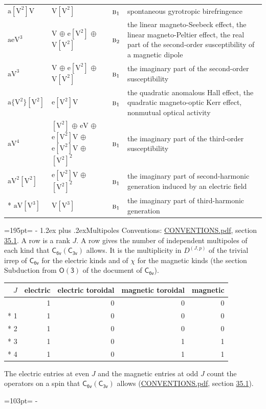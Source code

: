 \documentclass[10pt,a4paper]{article}
\makeatletter
\renewcommand\section{\@startsection{section}{1}{\z@}{-3ex plus -1ex minus -.2ex}%
  {1.2ex plus .2ex}{\normalfont\large\sffamily\bfseries\color{parttitle}}}
\newcommand{\needspace}[1]{\par\penalty-100\begingroup\dimen0=#1\relax\dimen2=\pagegoal
  \advance\dimen2-\pagetotal\ifdim\dimen0>\dimen2\relax\ifdim\dimen2>0pt\vfil\break\fi\fi
  \endgroup}
\numberwithin{equation}{section}
\newcommand{\grp}[1]{\mathsf{#1}}
\newcommand{\irr}[1]{\text{\normalfont\scshape #1}}
\newcommand{\irrJp}[2]{D^{(#1,#2)}}
\newcommand{\jahn}[1]{\mathrm{#1}}
\newlength{\fillwidth}\newlength{\cellwidth}\newlength{\colwidth}
\makeatother
\begin{document}
{\begin{longtable}{@{}lll>{\RaggedRight\arraybackslash}p{\fillwidth}@{}}
$\jahn{a[V^{2}]V}$ & $\jahn{V[V^{2}]}$ & $\irr{b}_{1}$ & spontaneous gyrotropic birefringence\\
$\jahn{aeV^{3}}$ & $\jahn{V}$ $\oplus$ $\jahn{e[V^{2}]}$ $\oplus$ $\jahn{V[V^{2}]}$ & $\irr{b}_{2}$ & the linear magneto-Seebeck effect, the linear magneto-Peltier effect, the real part of the second-order susceptibility of a magnetic dipole\\
$\jahn{aV^{3}}$ & $\jahn{V}$ $\oplus$ $\jahn{e[V^{2}]}$ $\oplus$ $\jahn{V[V^{2}]}$ & $\irr{b}_{1}$ & the imaginary part of the second-order susceptibility\\
$\jahn{a\{V^{2}\}[V^{2}]}$ & $\jahn{e[V^{2}]V}$ & $\irr{b}_{1}$ & the quadratic anomalous Hall effect, the quadratic magneto-optic Kerr effect, nonmutual optical activity\\
$\jahn{aV^{4}}$ & $\jahn{[V^{2}]}$ $\oplus$ $\jahn{eV}$ $\oplus$ $\jahn{e[V^{2}]V}$ $\oplus$ $\jahn{e[V^{2}]V}$ $\oplus$ $\jahn{[V^{2}]^{2}}$ & $\irr{b}_{1}$ & the imaginary part of the third-order susceptibility\\
$\jahn{aV^{2}[V^{2}]}$ & $\jahn{e[V^{2}]V}$ $\oplus$ $\jahn{[V^{2}]^{2}}$ & $\irr{b}_{1}$ & the imaginary part of second-harmonic generation induced by an electric field\\*
$\jahn{aV[V^{3}]}$ & $\jahn{V[V^{3}]}$ & $\irr{b}_{1}$ & the imaginary part of third-harmonic generation\\
\bottomrule\end{longtable}}
\needspace{195pt}
\section{Multipoles}\label{s:multipoles}
Conventions: \href{../../CONVENTIONS.pdf}{CONVENTIONS.pdf}, section \href{../../CONVENTIONS.pdf\#conv.35.1}{35.1}.
A row is a rank $J$. \label{n:head.multipole.electric}\label{n:head.multipole.electric.toroidal}\label{n:head.multipole.magnetic.toroidal}\label{n:head.multipole.magnetic}A row gives the number of independent multipoles of each kind that $\grp{C_{6v}}(\grp{C_{3v}})$ allows. It is the multiplicity in $\irrJp{J}{p}$ of the trivial irrep of $\grp{C_{6v}}$ for the electric kinds and of $\chi$ for the magnetic kinds (the section Subduction from $\grp{O(3)}$ of the document of \href{../../../rotation/data/pdf/C6v.pdf}{$\grp{C_{6v}}$}).
{\small\begin{longtable}{@{}rrrrr@{}}\toprule
$J$ & electric & electric toroidal & magnetic toroidal & magnetic\\\midrule\endhead
\bottomrule\endfoot\endlastfoot
0 & 1 & 0 & 0 & 0\\*
1 & 1 & 0 & 0 & 0\\*
2 & 1 & 0 & 0 & 0\\*
3 & 1 & 0 & 1 & 1\\*
4 & 1 & 0 & 1 & 1\\
\bottomrule\end{longtable}}
The electric entries at even $J$ and the magnetic entries at odd $J$ count the operators on a spin that $\grp{C_{6v}}(\grp{C_{3v}})$ allows (\href{../../CONVENTIONS.pdf}{CONVENTIONS.pdf}, section \href{../../CONVENTIONS.pdf\#conv.35.1}{35.1}).
\needspace{103pt}
\end{document}
